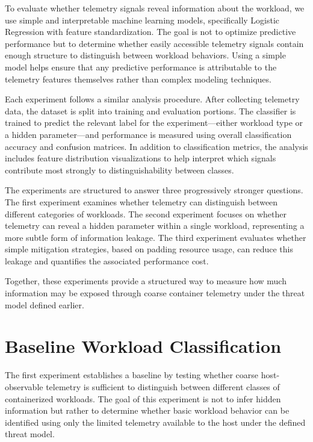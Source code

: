\documentclass[11pt]{article}
\begin{document}
To evaluate whether telemetry signals reveal information about the workload, we use simple and interpretable machine learning models, specifically Logistic Regression with feature standardization. The goal is not to optimize predictive performance but to determine whether easily accessible telemetry signals contain enough structure to distinguish between workload behaviors. Using a simple model helps ensure that any predictive performance is attributable to the telemetry features themselves rather than complex modeling techniques.

Each experiment follows a similar analysis procedure. After collecting telemetry data, the dataset is split into training and evaluation portions. The classifier is trained to predict the relevant label for the experiment—either workload type or a hidden parameter—and performance is measured using overall classification accuracy and confusion matrices. In addition to classification metrics, the analysis includes feature distribution visualizations to help interpret which signals contribute most strongly to distinguishability between classes.

The experiments are structured to answer three progressively stronger questions. The first experiment examines whether telemetry can distinguish between different categories of workloads. The second experiment focuses on whether telemetry can reveal a hidden parameter within a single workload, representing a more subtle form of information leakage. The third experiment evaluates whether simple mitigation strategies, based on padding resource usage, can reduce this leakage and quantifies the associated performance cost.

Together, these experiments provide a structured way to measure how much information may be exposed through coarse container telemetry under the threat model defined earlier.

\section{Baseline Workload Classification}

The first experiment establishes a baseline by testing whether coarse host-observable telemetry is sufficient to distinguish between different classes of containerized workloads. The goal of this experiment is not to infer hidden information but rather to determine whether basic workload behavior can be identified using only the limited telemetry available to the host under the defined threat model.
\end{document}
